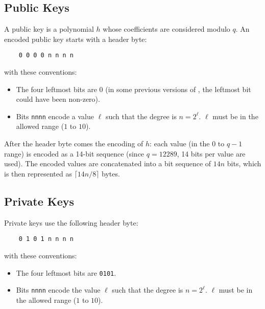 \subsection{Public Keys}

A \falcon public key is a polynomial $h$ whose coefficients are considered
modulo $q$. An encoded public key starts with a header byte:
\begin{verbatim}
    0 0 0 0 n n n n
\end{verbatim}
with these conventions:
\begin{itemize}
\item The four leftmost bits are 0 (in some previous versions of \falcon,
the leftmost bit could have been non-zero).
\item Bits \texttt{nnnn} encode a value $\ell$ such that the degree is
$n = 2^\ell$. $\ell$ must be in the allowed range ($1$ to $10$).
\end{itemize}

After the header byte comes the encoding of $h$: each value (in the $0$
to $q-1$ range) is encoded as a 14-bit sequence (since $q = 12289$, 14 bits
per value are used). The encoded values are concatenated
into a bit sequence of $14n$ bits, which is then represented as
$\lceil 14n/8\rceil$ bytes.

\subsection{Private Keys}

Private keys use the following header byte:
\begin{verbatim}
    0 1 0 1 n n n n
\end{verbatim}
with these conventions:
\begin{itemize}
\item The four leftmost bits are \texttt{0101}.
\item Bits \texttt{nnnn} encode the value $\ell$ such that the degree
is $n = 2^\ell$. $\ell$ must be in the allowed range ($1$ to $10$).
\end{itemize}

